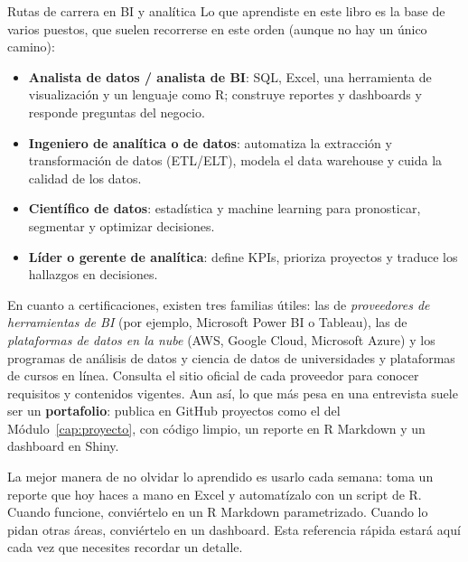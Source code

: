 \begin{negocio}{Rutas de carrera en BI y analítica}
Lo que aprendiste en este libro es la base de varios puestos, que suelen
recorrerse en este orden (aunque no hay un único camino):
\begin{itemize}
\item \textbf{Analista de datos / analista de BI}: SQL, Excel, una
  herramienta de visualización y un lenguaje como R; construye reportes y
  dashboards y responde preguntas del negocio.
\item \textbf{Ingeniero de analítica o de datos}: automatiza la extracción
  y transformación de datos (ETL/ELT), modela el data warehouse y cuida la
  calidad de los datos.
\item \textbf{Científico de datos}: estadística y machine learning para
  pronosticar, segmentar y optimizar decisiones.
\item \textbf{Líder o gerente de analítica}: define KPIs, prioriza
  proyectos y traduce los hallazgos en decisiones.
\end{itemize}
En cuanto a certificaciones, existen tres familias útiles: las de
\emph{proveedores de herramientas de BI} (por ejemplo, Microsoft Power BI
o Tableau), las de \emph{plataformas de datos en la nube} (AWS, Google
Cloud, Microsoft Azure) y los programas de análisis de datos y ciencia de
datos de universidades y plataformas de cursos en línea. Consulta el sitio
oficial de cada proveedor para conocer requisitos y contenidos vigentes.
Aun así, lo que más pesa en una entrevista suele ser un
\textbf{portafolio}: publica en GitHub proyectos como el del
Módulo~\ref{cap:proyecto}, con código limpio, un reporte en R Markdown y un
dashboard en Shiny.
\end{negocio}

\begin{consejo}
La mejor manera de no olvidar lo aprendido es usarlo cada semana: toma un
reporte que hoy haces a mano en Excel y automatízalo con un script de R.
Cuando funcione, conviértelo en un R Markdown parametrizado. Cuando lo pidan
otras áreas, conviértelo en un dashboard. Esta referencia rápida estará aquí
cada vez que necesites recordar un detalle.
\end{consejo}
